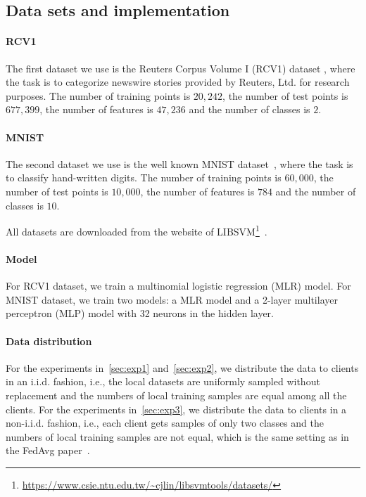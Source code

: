 \subsection{Data sets and implementation} \label{sec:details}
\paragraph{RCV1} The first dataset we use is the Reuters Corpus Volume I (RCV1) dataset \citep{lewis2004rcv1}, where the task is to categorize newswire
stories provided by Reuters, Ltd. for research purposes. The number of training points is $20,242$, the number of test points is $677,399$, the number of features is $47,236$ and the number of classes is $2$.

\paragraph{MNIST} The second dataset we use is the well known MNIST dataset~\citep{lecun1998gradient}, where the task is to classify hand-written digits. The number of training points is $60,000$, the number of test points is $10,000$, the number of features is $784$ and the number of classes is $10$.

All datasets are downloaded from the website of LIBSVM\footnote{\url{https://www.csie.ntu.edu.tw/~cjlin/libsvmtools/datasets/}}~\citep{libsvm}.

\paragraph{Model} For RCV1 dataset, we train a multinomial logistic regression (MLR) model. For MNIST dataset, we train two models: a MLR model and a 2-layer multilayer perceptron (MLP) model with 32 neurons in the hidden layer. 

\paragraph{Data distribution} For the experiments in~\autoref{sec:exp1} and~\autoref{sec:exp2}, we distribute the data to clients in an i.i.d. fashion, i.e., the local datasets are uniformly sampled without replacement and the numbers of local training samples are equal among all the clients. For the experiments in~\autoref{sec:exp3},  we distribute the data to clients in a non-i.i.d. fashion, i.e., each client gets samples of only two classes and the numbers of local training samples are not equal, which is the same setting as in the FedAvg paper~\citep{mcmahan2017communication}.

